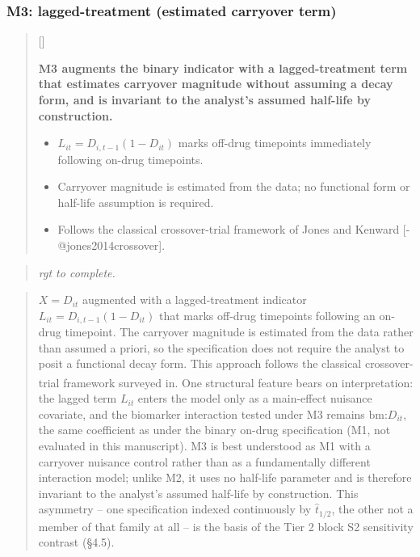 \documentclass[
  11pt,
]{article}
\newcounter{pgraph}
\newenvironment{bullets}{%
  \stepcounter{pgraph}%
  \begin{quote}\small\sffamily\color[gray]{0.30}%
  {\normalfont\scriptsize\color[gray]{0.58}[\thepgraph]\enspace}}{%
  \end{quote}}
\newenvironment{rgt}{%
  \begin{quote}\small\itshape\color[RGB]{20,60,160}}{%
  \end{quote}}
\newenvironment{orig}{%
  \begin{quote}\normalsize\color[gray]{0.55}}{%
  \end{quote}}
\begin{document}
\subsubsection{M3: lagged-treatment (estimated carryover term)}\label{m3-lagged-treatment-estimated-carryover-term}

\begin{bullets}

\textbf{M3 augments the binary indicator with a lagged-treatment term
that estimates carryover magnitude without assuming a decay form, and
is invariant to the analyst's assumed half-life by construction.}

\begin{itemize}\setlength{\itemsep}{2pt}\setlength{\parskip}{0pt}
\item $L_{it} = D_{i,t-1}(1 - D_{it})$ marks off-drug timepoints
immediately following on-drug timepoints.
\item Carryover magnitude is estimated from the data; no functional
form or half-life assumption is required.
\item Follows the classical crossover-trial framework of Jones and
Kenward [-@jones2014crossover].
\end{itemize}

\end{bullets}

\begin{rgt}
rgt to complete.

\end{rgt}

\begin{orig}
\(X = D_{it}\) augmented with a lagged-treatment indicator
\(L_{it} = D_{i,t-1}(1 - D_{it})\) that marks off-drug timepoints
following an on-drug timepoint. The carryover magnitude is estimated
from the data rather than assumed a priori, so the specification
does not require the analyst to posit a functional decay form. This
approach follows the classical crossover-trial framework surveyed in\textsuperscript{}. One structural feature bears on
interpretation: the lagged term \(L_{it}\) enters the model only as a
main-effect nuisance covariate, and the biomarker interaction tested
under M3 remains \(\text{bm:}D_{it}\), the same coefficient as under
the binary on-drug specification (M1, not evaluated in this
manuscript). M3 is best understood as M1 with a carryover nuisance
control rather than as a fundamentally different interaction model;
unlike M2, it uses no half-life parameter and is therefore invariant
to the analyst's assumed half-life by construction. This asymmetry --
one specification indexed continuously by \(\hat{t}_{1/2}\), the other
not a member of that family at all -- is the basis of the Tier 2
block S2 sensitivity contrast (§4.5).

\end{orig}
\end{document}
